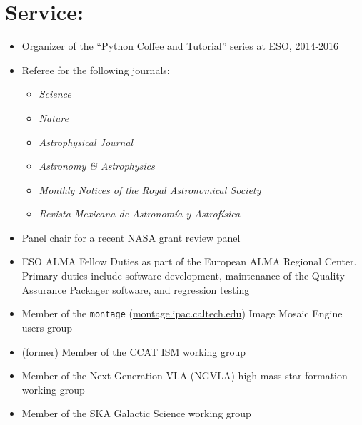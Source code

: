
\section*{Service:}
\vspace{-10pt}
\begin{itemize}
\itemsep-3pt
        
    \item Organizer of the ``Python Coffee and Tutorial'' series at ESO, 2014-2016
    \item Referee for the following journals:
        \begin{itemize}
            \itemsep-3pt
            \item \textit{Science}
            \item \textit{Nature}
            \item \textit{Astrophysical Journal}
            \item \textit{Astronomy \& Astrophysics}
            \item \textit{Monthly Notices of the Royal Astronomical Society}
            \item \textit{Revista Mexicana de Astronom{\'i}a y Astrof{\'i}sica}
    \end{itemize}
    \item Panel chair for a recent NASA grant review panel
    \item ESO ALMA Fellow Duties as part of the European ALMA Regional Center.
        Primary duties include software development, maintenance of the
        Quality Assurance Packager software, and regression testing
    \item Member of the \texttt{montage} (\url{montage.ipac.caltech.edu}) Image
        Mosaic Engine users group
    \item (former) Member of the CCAT ISM working group
    \item Member of the Next-Generation VLA (NGVLA) high mass star formation
        working group
    \item Member of the SKA Galactic Science
        working group
\end{itemize}
